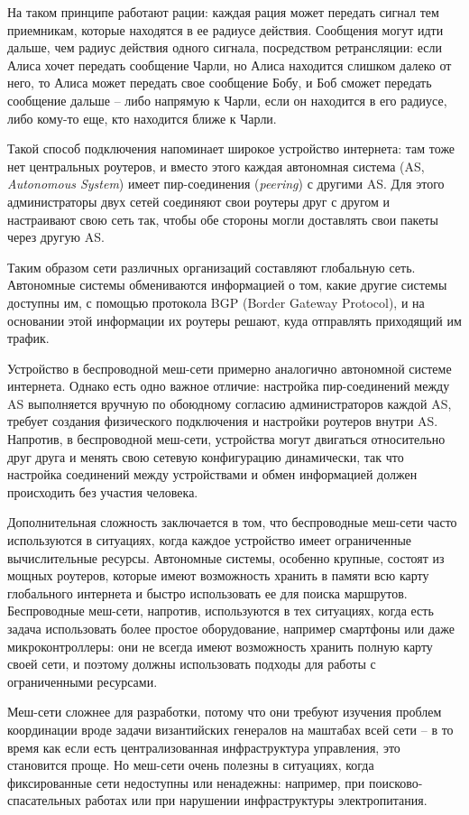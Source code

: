 \documentclass[%
]{report}
\begin{document}
На таком принципе работают рации:
каждая рация может передать сигнал тем приемникам, которые находятся в ее радиусе действия.
Сообщения могут идти дальше, чем радиус действия одного сигнала,
посредством ретрансляции:
если Алиса хочет передать сообщение Чарли,
но Алиса находится слишком далеко от него,
то Алиса может передать свое сообщение Бобу,
и Боб сможет передать сообщение дальше --
либо напрямую к Чарли, если он находится в его радиусе,
либо кому-то еще, кто находится ближе к Чарли.

Такой способ подключения напоминает широкое устройство интернета:
там тоже нет центральных роутеров,
и вместо этого каждая автономная система (AS, \emph{Autonomous System})
имеет пир-соединения (\emph{peering}) с другими AS.
Для этого администраторы двух сетей
соединяют свои роутеры друг с другом
и настраивают свою сеть так, чтобы обе стороны
могли доставлять свои пакеты через другую AS.

Таким образом сети различных организаций составляют глобальную сеть.
Автономные системы обмениваются информацией о том, какие другие системы доступны им,
с помощью протокола BGP (Border Gateway Protocol),
и на основании этой информации их роутеры решают, куда отправлять приходящий им трафик.

Устройство в беспроводной меш-сети примерно аналогично автономной системе интернета.
Однако есть одно важное отличие:
настройка пир-соединений между AS выполняется вручную
по обоюдному согласию администраторов каждой AS,
требует создания физического подключения
и настройки роутеров внутри AS.
Напротив, в беспроводной меш-сети,
устройства могут двигаться относительно друг друга и менять свою сетевую конфигурацию динамически,
так что настройка соединений между устройствами и обмен информацией
должен происходить без участия человека.

Дополнительная сложность заключается в том, что
беспроводные меш-сети часто используются в ситуациях,
когда каждое устройство имеет ограниченные вычислительные ресурсы.
Автономные системы, особенно крупные,
состоят из мощных роутеров,
которые имеют возможность хранить в памяти всю карту глобального интернета
и быстро использовать ее для поиска маршрутов.
Беспроводные меш-сети, напротив, используются в тех ситуациях,
когда есть задача использовать более простое оборудование,
например смартфоны или даже микроконтроллеры:
они не всегда имеют возможность хранить полную карту своей сети,
и поэтому должны использовать подходы для работы с ограниченными ресурсами.

Меш-сети сложнее для разработки, потому что они требуют
изучения проблем координации вроде задачи византийских генералов на маштабах всей сети --
в то время как если есть централизованная инфраструктура управления, это становится проще.
Но меш-сети очень полезны в ситуациях, когда фиксированные сети недоступны или ненадежны:
например, при поисково-спасательных работах или при нарушении инфраструктуры электропитания.
\end{document}
